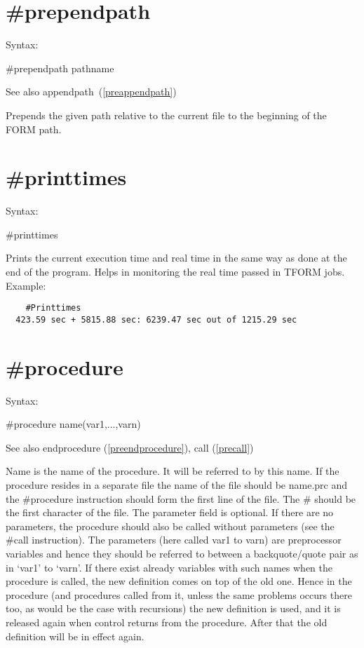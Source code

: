  
\section{\#prependpath}
\label{preprependpath}

\noindent Syntax:

\#prependpath pathname

\noindent See also appendpath~(\ref{preappendpath})

\noindent Prepends the given path relative to the current file to the beginning
of the FORM path.

 
\section{\#printtimes}
\label{preprinttimes}

\noindent Syntax:

\#printtimes

\noindent Prints the current execution time and real 
time in the same way as done at the end of the program. Helps in monitoring 
the real time passed in TFORM jobs.
Example:
\begin{verbatim}
    #Printtimes
  423.59 sec + 5815.88 sec: 6239.47 sec out of 1215.29 sec
\end{verbatim}


\section{\#procedure}
\label{preprocedure}

\noindent Syntax:

\#procedure name(var1,...,varn)
 
\noindent See also endprocedure (\ref{preendprocedure}), call
(\ref{precall})

\noindent Name is the name of the 
procedure. It will be referred to by this name. If the 
procedure resides in a separate file the name of the file should be 
name.prc and the \#procedure instruction should form the first line of the 
file. The \# should be the first character of the file. The parameter field 
is optional. If there are no parameters, the procedure should also be 
called without parameters (see the \#call instruction). The parameters 
(here called var1 to varn) are preprocessor variables and hence they should 
be referred to between a backquote/quote pair 
as in `var1' to `varn'. If there exist already variables with such names 
when the procedure is called, the new definition comes on top of the old 
one. Hence in the procedure (and procedures called from it, unless the same 
problems occurs there too, as would be the case with recursions) the new 
definition is used, and it is released again when control returns from the 
procedure. After that the old definition will be in effect again.


